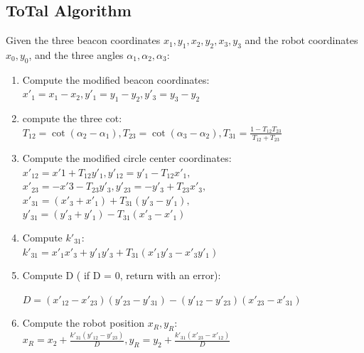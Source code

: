 \subsection{ToTal Algorithm}
\label{app:total}
Given the three beacon coordinates \({x_1, y_1}, {x_2, y_2}, {x_3, y_3}\) and the robot coordinates \({x_0, y_0}\), and the three angles \({\alpha_1, \alpha_2, \alpha_3}\):
\begin{enumerate}
    \item Compute the modified beacon coordinates: \\
        \(x'_1 = x_1 - x_2, y'_1 = y_1 - y_2, y'_3 = y_3 - y_2\) \\
    \item compute the three cot: \\
        \(T_{12} = \cot(\alpha_2 - \alpha_1), T_{23} = \cot(\alpha_3 - \alpha_2), T_{31} = \frac{1-T_{12}T_{23}}{T_{12} + T_{23}}\)
    
    \item Compute the modified circle center coordinates: \\
        \(x'_12 = x'1 + T_{12}y'_1, y'_12 = y'_1 - T_{12}x'_1,\) \\
        \(x'_23 = -x'3 - T_{23}y'_3, y'_23 = -y'_3 + T_{23}x'_3,\) \\
        \(x'_31 = (x'_3 + x'_1) + T_{31}(y'_3 - y'_1),\) \\
        \(y'_31 = (y'_3 + y'_1) - T_{31}(x'_3 - x'_1)\) 
    
    \item Compute \(k'_{31}\): \\

        \(k'_{31} = x'_1x'_3 + y'_1y'_3 + T_{31}(x'_1y'_3 - x'_3y'_1)\)
    
    \item Compute D ( if D = 0, return with an error):

        \(D = (x'_{12}-x'_{23})(y'_{23}-y'_{31}) - (y'_{12}-y'_{23})(x'_{23}-x'_{31})\)
    
    \item Compute the robot position \({x_R, y_R}\): \\
        \(x_R = x_2 + \frac{k'_{31}(y'_{12}-y'_{23})}{D}, y_R = y_2 + \frac{k'_{31}(x'_{23}-x'_{12})}{D}\)
\end{enumerate}


